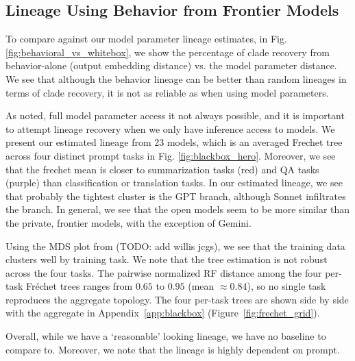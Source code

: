 \documentclass{article}
\theoremstyle{definition}
\theoremstyle{plain}
\begin{document}
\subsection{Lineage Using Behavior from Frontier Models}
\label{sec:results:blackbox}

To compare against our model parameter lineage estimates, in Fig. \ref{fig:behavioral_vs_whitebox}, we show the percentage of clade recovery from behavior-alone (output embedding distance) vs. the model parameter distance.  We see that although the behavior lineage can be better than random lineages in terms of clade recovery, it is not as reliable as when using model parameters.

As noted, full model parameter access it not always possible, and it is important to attempt lineage recovery when we only have inference access to models.  We present our estimated lineage from 23 models, which is an averaged Frechet tree across four distinct prompt tasks in Fig. \ref{fig:blackbox_hero}.   Moreover, we see that the frechet mean is closer to summarization tasks (red) and QA tasks (purple) than classification or translation tasks.  In our estimated lineage, we see that probably the tightest cluster is the GPT branch, although Sonnet infiltrates the branch.  In general, we see that the open models seem to be more similar than the private, frontier models, with the exception of Gemini.

Using the MDS plot from (TODO: add willis jcgs), we see that the training data clusters well by training task. We note that the tree estimation is not robust across the four tasks. The pairwise normalized RF distance among the
four per-task Fr\'echet trees ranges from $0.65$ to $0.95$ (mean $\approx 0.84$), so no single task
reproduces the aggregate topology. The four per-task trees are shown side by side with the aggregate
in Appendix~\ref{app:blackbox} (Figure~\ref{fig:frechet_grid}).

Overall, while we have a `reasonable' looking lineage, we have no baseline to compare to.  Moreover, we note that the lineage is highly dependent on prompt.
\end{document}
